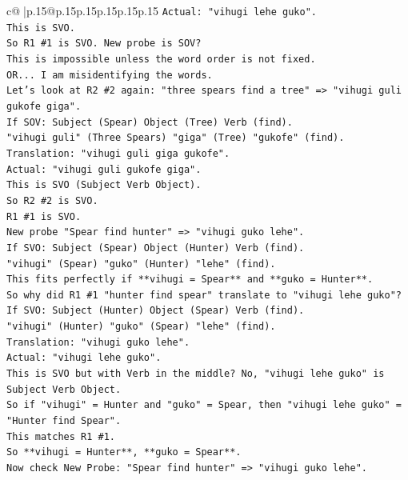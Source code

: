 \documentclass{article}
\begin{document}
{\begin{supertabular}{c@{$\;$}|p{.15\linewidth}@{}p{.15\linewidth}p{.15\linewidth}p{.15\linewidth}p{.15\linewidth}p{.15\linewidth}}
{{{\texttt{Actual: "vihugi lehe guko".} \\
\texttt{This is SVO.} \\
\texttt{So R1 \#1 is SVO. New probe is SOV?} \\
\texttt{This is impossible unless the word order is not fixed.} \\
\texttt{OR... I am misidentifying the words.} \\
\texttt{Let's look at R2 \#2 again: "three spears find a tree" => "vihugi guli gukofe giga".} \\
\texttt{If SOV: Subject (Spear) Object (Tree) Verb (find).} \\
\texttt{"vihugi guli" (Three Spears) "giga" (Tree) "gukofe" (find).} \\
\texttt{Translation: "vihugi guli giga gukofe".} \\
\texttt{Actual: "vihugi guli gukofe giga".} \\
\texttt{This is SVO (Subject Verb Object).} \\
\texttt{So R2 \#2 is SVO.} \\
\texttt{R1 \#1 is SVO.} \\
\texttt{New probe "Spear find hunter" => "vihugi guko lehe".} \\
\texttt{If SVO: Subject (Spear) Object (Hunter) Verb (find).} \\
\texttt{"vihugi" (Spear) "guko" (Hunter) "lehe" (find).} \\
\texttt{This fits perfectly if **vihugi = Spear** and **guko = Hunter**.} \\
\texttt{So why did R1 \#1 "hunter find spear" translate to "vihugi lehe guko"?} \\
\texttt{If SVO: Subject (Hunter) Object (Spear) Verb (find).} \\
\texttt{"vihugi" (Hunter) "guko" (Spear) "lehe" (find).} \\
\texttt{Translation: "vihugi guko lehe".} \\
\texttt{Actual: "vihugi lehe guko".} \\
\texttt{This is SVO but with Verb in the middle? No, "vihugi lehe guko" is Subject Verb Object.} \\
\texttt{So if "vihugi" = Hunter and "guko" = Spear, then "vihugi lehe guko" = "Hunter find Spear".} \\
\texttt{This matches R1 \#1.} \\
\texttt{So **vihugi = Hunter**, **guko = Spear**.} \\
\texttt{Now check New Probe: "Spear find hunter" => "vihugi guko lehe".} \\
}}}
\end{supertabular}}
\end{document}
